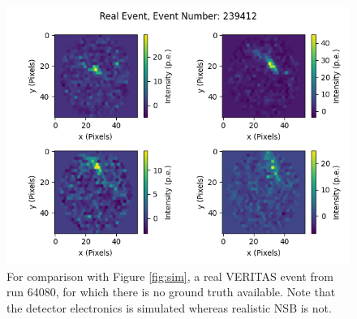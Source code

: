 \begin{figure}[h] 
        \centering \includegraphics[width=0.8\columnwidth]{figures/realevent_303_oversampling.png}

        \caption{
                \label{fig:real} For comparison with Figure \ref{fig:sim}, a real VERITAS event from run 64080, for which there is no ground truth available. Note that the detector electronics is simulated whereas realistic NSB is not.
        }
\end{figure}
